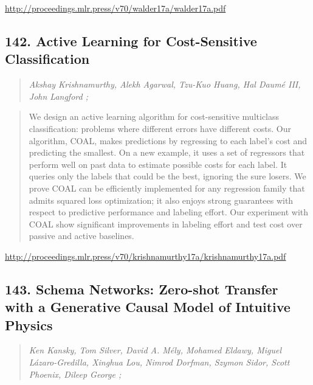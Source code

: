 \documentclass{article}
\begin{document}
\href{http://proceedings.mlr.press/v70/walder17a/walder17a.pdf}{http://proceedings.mlr.press/v70/walder17a/walder17a.pdf}

\subsection{142. Active Learning for Cost-Sensitive Classification}

\begin{quote}
\footnotesize{\textit{Akshay Krishnamurthy, Alekh Agarwal, Tzu-Kuo Huang, Hal Daumé III, John Langford ;}}
\end{quote}

\begin{quote}
    We design an active learning algorithm for cost-sensitive multiclass classification: problems where different errors have different costs. Our algorithm, COAL, makes predictions by regressing to each label’s cost and predicting the smallest. On a new example, it uses a set of regressors that perform well on past data to estimate possible costs for each label. It queries only the labels that could be the best, ignoring the sure losers. We prove COAL can be efficiently implemented for any regression family that admits squared loss optimization; it also enjoys strong guarantees with respect to predictive performance and labeling effort. Our experiment with COAL show significant improvements in labeling effort and test cost over passive and active baselines.  \end{quote}

\href{http://proceedings.mlr.press/v70/krishnamurthy17a/krishnamurthy17a.pdf}{http://proceedings.mlr.press/v70/krishnamurthy17a/krishnamurthy17a.pdf}

\subsection{143. Schema Networks: Zero-shot Transfer with a Generative Causal Model of Intuitive Physics}

\begin{quote}
\footnotesize{\textit{Ken Kansky, Tom Silver, David A. Mély, Mohamed Eldawy, Miguel Lázaro-Gredilla, Xinghua Lou, Nimrod Dorfman, Szymon Sidor, Scott Phoenix, Dileep George ;}}
\end{quote}
\end{document}
